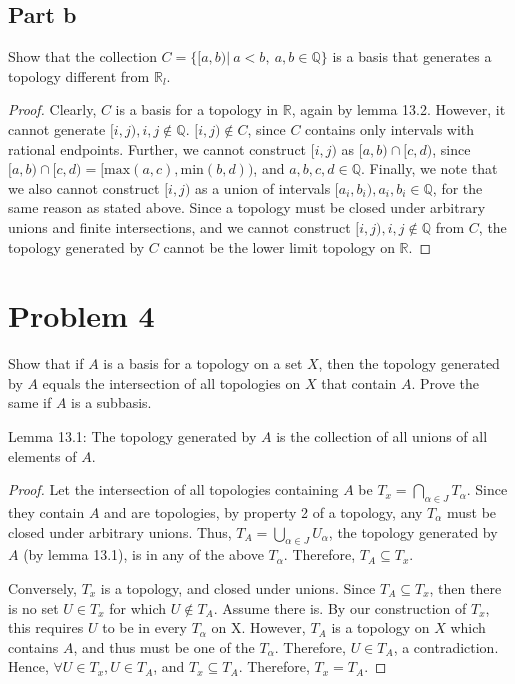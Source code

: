 \documentclass[11pt]{article}
\begin{document}
\subsection{Part b}
\label{sec:org067b9e7}
Show that the collection \(C = \{[a,b)|\ a<b,\ a,b \in \mathbb{Q}\}\) is a
basis that generates a topology different from \(\mathbb{R}_l\).

\begin{proof}


Clearly, \(C\) is a basis for a topology in \(\mathbb{R}\), again by lemma
13.2. However, it cannot generate \([i,j), i,j
\not\in\mathbb{Q}\). \([i,j) \not\in C\), since \(C\) contains only
intervals with rational endpoints. Further, we cannot construct
\([i,j)\) as \([a,b)\cap[c,d)\), since \([a,b)\cap[c,d) = [\text{max}(a,c),
\text{min}(b,d))\), and \(a,b,c,d \in \mathbb{Q}\). Finally, we note that
we also cannot construct \([i,j)\) as a union of intervals \([a_i, b_i),
a_i, b_i \in\mathbb{Q}\), for the same reason as stated above. Since a
topology must be closed under arbitrary unions and finite
intersections, and we cannot construct \([i,j), i,j \not\in\mathbb{Q}\)
from \(C\), the topology generated by \(C\) cannot be the lower limit
topology on \(\mathbb{R}\).
\end{proof}

\section{Problem 4}
\label{sec:orgaa883d4}

Show that if \(A\) is a basis for a topology on a set \(X\), then the
topology generated by \(A\) equals the intersection of all topologies on
\(X\) that contain \(A\). Prove the same if \(A\) is a subbasis.

Lemma 13.1: The topology generated by \(A\) is the collection of all
unions of all elements of \(A\). 

\begin{proof}


Let the intersection of all topologies containing \(A\) be \(T_x =
\bigcap\limits_{\alpha \in J}T_{\alpha}\). Since they contain \(A\) and
are topologies, by property 2 of a topology, any \(T_{\alpha}\) must be
closed under arbitrary unions. Thus, \(T_A = \bigcup\limits_{\alpha \in
J} U_{\alpha}\), the topology generated by \(A\) (by lemma 13.1), is in
any of the above \(T_{\alpha}\). Therefore, \(T_A \subseteq T_x\).

Conversely, \(T_x\) is a topology, and closed under unions. Since \(T_A
\subseteq T_x\), then there is no set \(U \in T_x\) for which \(U \not\in
T_A\). Assume there is. By our construction of \(T_x\), this requires \(U\)
to be in every \(T_{\alpha}\) on X. However, \(T_A\) is a topology on \(X\)
which contains \(A\), and thus must be one of the
\(T_{\alpha}\). Therefore, \(U \in T_A\), a contradiction. Hence, \(\forall
U \in T_x, U \in T_A\), and \(T_x \subseteq T_A\). Therefore, \(T_x =
T_A\).
\end{proof}
\end{document}
